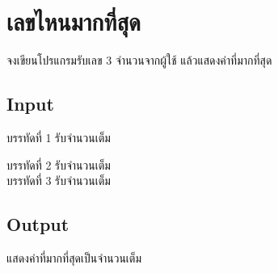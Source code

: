 \documentclass{article}
\begin{document}
\section*{เลขไหนมากที่สุด}

{จงเขียนโปรแกรมรับเลข 3 จำนวนจากผู้ใช้ แล้วแสดงค่าที่มากที่สุด}\\



\subsection*{Input}
บรรทัดที่ 1 รับจำนวนเต็ม



บรรทัดที่ 2 รับจำนวนเต็ม\\



บรรทัดที่ 3 รับจำนวนเต็ม



\subsection*{Output}
{แสดงค่าที่มากที่สุดเป็นจำนวนเต็ม}\\
\end{document}
